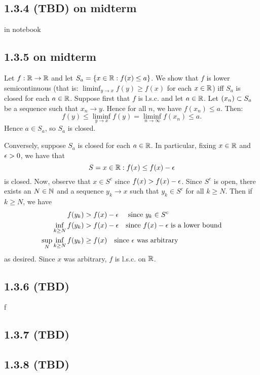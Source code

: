 \documentclass[11pt]{article}
\begin{document}
\subsection*{1.3.4 (TBD) on midterm}


in notebook



\subsection*{1.3.5 on midterm}

Let $f:{\mathbb R} \to {\mathbb R}$ and let $S_a = \{x \in {\mathbb R} : f(x) \leq a\}$. We show that $f$ is lower semicontinuous (that is: $\liminf_{y\to x}f(y) \geq f(x)$ for each $x \in {\mathbb R}$) iff $S_a$ is closed for each $a \in {\mathbb R}$. Suppose first that $f$ is l.s.c. and let $a \in {\mathbb R}$. Let $(x_n) \subset S_a$ be a sequence such that $x_n \to y$. Hence for all $n$, we have $f(x_n) \leq a$. Then: \[f(y) \leq \liminf_{y \to x} f(y) = \liminf_{n \to \infty} f(x_n) \leq a.\] Hence $a \in S_a$, so $S_a$ is closed. 

Conversely, suppose $S_a$ is closed for each $a \in {\mathbb R}$. In particular, fixing $x \in {\mathbb R}$ and $\epsilon > 0$, we have that \[S = x \in {\mathbb R} : f(x) \leq f(x) - \epsilon\] is closed. Now, observe that $x \in S^c$ since $f(x) > f(x) - \epsilon$. Since $S^c$ is open, there exists an $N \in {\mathbb N}$ and a sequence $y_k \to x$ such that $y_k \in S^c$ for all $k \geq N$. Then if $k \geq N$, we have \begin{align*}
    f(y_k) &> f(x) - \epsilon \quad \text{ since $y_k \in S^c$} \\
    \inf_{k \geq N} f(y_k) &> f(x) - \epsilon \quad \text{since $f(x)-\epsilon$ is a lower bound} \\
    \sup_{N} \inf_{k \geq N} f(y_k) &\geq f(x) \quad \text{since $\epsilon$ was arbitrary}
\end{align*} as desired. Since $x$ was arbitrary, $f$ is l.s.c. on ${\mathbb R}$.

\subsection*{1.3.6 (TBD)}


f

\subsection*{1.3.7 (TBD)}

\subsection*{1.3.8 (TBD)} 
\end{document}
